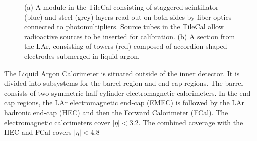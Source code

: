 \begin{figure}[h!]
\captionsetup[subfigure]{position=b}
\centering
{}
\caption{(a) A module in the TileCal consisting of staggered scintillator (blue) and steel (grey) layers read out on both sides by fiber optics connected to photomultipliers. Source tubes in the TileCal allow radioactive sources to be inserted for calibration. (b) A section from the LAr, consisting of towers (red) composed of accordion shaped electrodes submerged in liquid argon.}
\label{fig:atlasCalo}
\end{figure}

The Liquid Argon Calorimeter is situated outside of the inner detector.
It is divided into subsystems for the barrel region and end-cap regions.
The barrel consists of two symmetric half-cylinder electromagnetic calorimeters.
In the end-cap regions, the LAr electromagnetic end-cap (EMEC) is followed by the LAr hadronic end-cap (HEC) and then the Forward Calorimeter (FCal).
The electromagnetic calorimeters cover $|\eta|<3.2$.
The combined coverage with the HEC and FCal covers $|\eta|<4.8$

